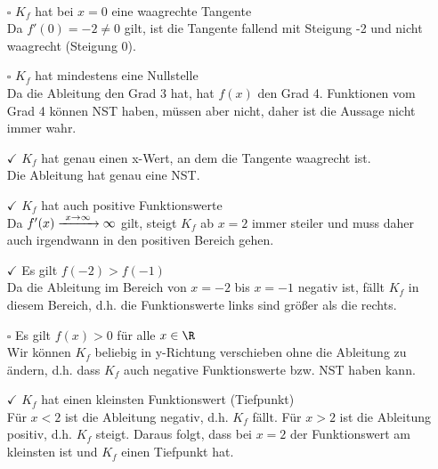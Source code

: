 \begin{Answer}[ref=ableitungInterpretationA1]\\
	\begin{itemize}
		\item[$\square$] \(K_f\) hat bei \(x=0\) eine waagrechte Tangente\\
		Da \(f'(0)=-2\neq 0\) gilt, ist die Tangente fallend mit Steigung -2 und nicht waagrecht (Steigung 0).
		\item[$\square$] \(K_f\) hat mindestens eine Nullstelle\\
		Da die Ableitung den Grad 3 hat, hat \(f(x)\) den Grad 4. Funktionen vom Grad 4 können NST haben, müssen aber nicht, daher ist die Aussage nicht immer wahr.
		\item[$\checkmark$] \(K_f\) hat genau einen x-Wert, an dem die Tangente waagrecht ist.\\
		Die Ableitung hat genau eine NST.
		\item[$\checkmark$] \(K_f\) hat auch positive Funktionswerte\\
		Da \(f'(x)\xrightarrow{\hphantom{\ }x\to\infty\hphantom{\ }}\infty\) gilt, steigt \(K_f\) ab \(x=2\) immer steiler und muss daher auch irgendwann in den positiven Bereich gehen.
		\item[$\checkmark$] Es gilt \(f(-2)>f(-1)\)\\
		Da die Ableitung im Bereich von \(x=-2\) bis \(x=-1\) negativ ist, fällt \(K_f\) in diesem Bereich, d.h. die Funktionswerte links sind größer als die rechts.
		\item[$\square$] Es gilt \(f(x)>0\) für alle \(x\in\R\)\\
		Wir können \(K_f\) beliebig in y-Richtung verschieben ohne die Ableitung zu ändern, d.h. dass \(K_f\) auch negative Funktionswerte bzw. NST haben kann.
		\item[$\checkmark$] \(K_f\) hat einen kleinsten Funktionswert (Tiefpunkt)	\\
		Für \(x<2\) ist die Ableitung negativ, d.h. \(K_f\) fällt. Für \(x>2\) ist die Ableitung positiv, d.h. \(K_f\) steigt. Daraus folgt, dass bei \(x=2\) der Funktionswert am kleinsten ist und \(K_f\) einen Tiefpunkt hat.
	\end{itemize}
\end{Answer}